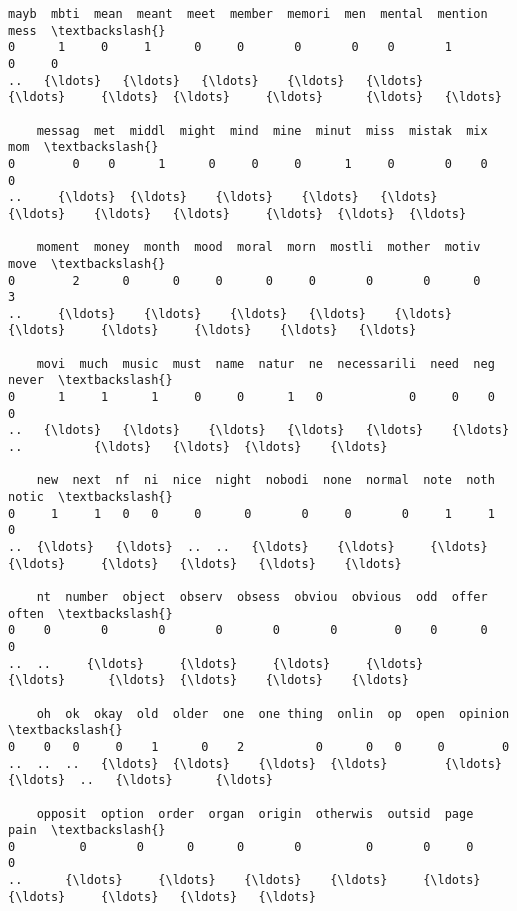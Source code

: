 \documentclass[11pt]{article}
\begin{document}
\begin{Verbatim}[commandchars=\\\{\}]
    mayb  mbti  mean  meant  meet  member  memori  men  mental  mention  mess  \textbackslash{}
0      1     0     1      0     0       0       0    0       1        0     0   
..   {\ldots}   {\ldots}   {\ldots}    {\ldots}   {\ldots}     {\ldots}     {\ldots}  {\ldots}     {\ldots}      {\ldots}   {\ldots}   

    messag  met  middl  might  mind  mine  minut  miss  mistak  mix  mom  \textbackslash{}
0        0    0      1      0     0     0      1     0       0    0    0   
..     {\ldots}  {\ldots}    {\ldots}    {\ldots}   {\ldots}   {\ldots}    {\ldots}   {\ldots}     {\ldots}  {\ldots}  {\ldots}   

    moment  money  month  mood  moral  morn  mostli  mother  motiv  move  \textbackslash{}
0        2      0      0     0      0     0       0       0      0     3   
..     {\ldots}    {\ldots}    {\ldots}   {\ldots}    {\ldots}   {\ldots}     {\ldots}     {\ldots}    {\ldots}   {\ldots}   

    movi  much  music  must  name  natur  ne  necessarili  need  neg  never  \textbackslash{}
0      1     1      1     0     0      1   0            0     0    0      0   
..   {\ldots}   {\ldots}    {\ldots}   {\ldots}   {\ldots}    {\ldots}  ..          {\ldots}   {\ldots}  {\ldots}    {\ldots}   

    new  next  nf  ni  nice  night  nobodi  none  normal  note  noth  notic  \textbackslash{}
0     1     1   0   0     0      0       0     0       0     1     1      0   
..  {\ldots}   {\ldots}  ..  ..   {\ldots}    {\ldots}     {\ldots}   {\ldots}     {\ldots}   {\ldots}   {\ldots}    {\ldots}   

    nt  number  object  observ  obsess  obviou  obvious  odd  offer  often  \textbackslash{}
0    0       0       0       0       0       0        0    0      0      0   
..  ..     {\ldots}     {\ldots}     {\ldots}     {\ldots}     {\ldots}      {\ldots}  {\ldots}    {\ldots}    {\ldots}   

    oh  ok  okay  old  older  one  one thing  onlin  op  open  opinion  \textbackslash{}
0    0   0     0    1      0    2          0      0   0     0        0   
..  ..  ..   {\ldots}  {\ldots}    {\ldots}  {\ldots}        {\ldots}    {\ldots}  ..   {\ldots}      {\ldots}   

    opposit  option  order  organ  origin  otherwis  outsid  page  pain  \textbackslash{}
0         0       0      0      0       0         0       0     0     0   
..      {\ldots}     {\ldots}    {\ldots}    {\ldots}     {\ldots}       {\ldots}     {\ldots}   {\ldots}   {\ldots}   


\end{Verbatim}
\end{document}
